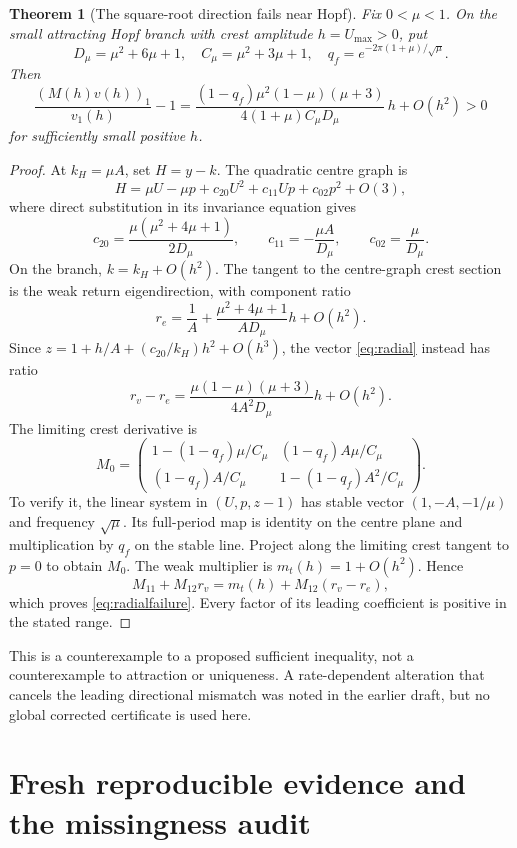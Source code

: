 \documentclass[11pt,a4paper]{article}
\numberwithin{equation}{section}
\newtheorem{theorem}{Theorem}[section]
\theoremstyle{remark}\newtheorem{remark}[theorem]{Remark}
\begin{document}
\begin{theorem}[The square-root direction fails near Hopf]\label{thm:failed}
Fix $0<\mu<1$. On the small attracting Hopf branch with crest amplitude $h=U_{\max}>0$, put
\[
D_\mu=\mu^2+6\mu+1,\quad C_\mu=\mu^2+3\mu+1,\quad
q_f=e^{-2\pi(1+\mu)/\sqrt\mu}.
\]
Then
\begin{equation}\label{eq:radialfailure}
\frac{(M(h)v(h))_1}{v_1(h)}-1
=\frac{(1-q_f)\mu^2(1-\mu)(\mu+3)}
 {4(1+\mu)C_\mu D_\mu}\,h+O(h^2)>0
\end{equation}
for sufficiently small positive $h$.
\end{theorem}
\begin{proof}
At $k_H=\mu A$, set $H=y-k$. The quadratic centre graph is
\[
H=\mu U-\mu p+c_{20}U^2+c_{11}Up+c_{02}p^2+O(3),
\]
where direct substitution in its invariance equation gives
\[
c_{20}=\frac{\mu(\mu^2+4\mu+1)}{2D_\mu},\qquad
c_{11}=-\frac{\mu A}{D_\mu},\qquad c_{02}=\frac\mu{D_\mu}.
\]
On the branch, $k=k_H+O(h^2)$. The tangent to the centre-graph crest section is the weak return eigendirection, with component ratio
\[
r_e=\frac1A+\frac{\mu^2+4\mu+1}{AD_\mu}h+O(h^2).
\]
Since $z=1+h/A+(c_{20}/k_H)h^2+O(h^3)$, the vector \eqref{eq:radial} instead has ratio
\[
r_v-r_e=\frac{\mu(1-\mu)(\mu+3)}{4A^2D_\mu}h+O(h^2).
\]
The limiting crest derivative is
\[
M_0=\begin{pmatrix}
1-(1-q_f)\mu/C_\mu &(1-q_f)A\mu/C_\mu\\
(1-q_f)A/C_\mu &1-(1-q_f)A^2/C_\mu
\end{pmatrix}.
\]
To verify it, the linear system in $(U,p,z-1)$ has stable vector $(1,-A,-1/\mu)$ and frequency $\sqrt\mu$. Its full-period map is identity on the centre plane and multiplication by $q_f$ on the stable line. Project along the limiting crest tangent to $p=0$ to obtain $M_0$.
The weak multiplier is $m_t(h)=1+O(h^2)$. Hence
\[
M_{11}+M_{12}r_v=m_t(h)+M_{12}(r_v-r_e),
\]
which proves \eqref{eq:radialfailure}. Every factor of its leading coefficient is positive in the stated range.
\end{proof}
This is a counterexample to a proposed sufficient inequality, not a counterexample to attraction or uniqueness. A rate-dependent alteration that cancels the leading directional mismatch was noted in the earlier draft, but no global corrected certificate is used here.

\section{Fresh reproducible evidence and the missingness audit}\label{sec:evidence}
\end{document}
